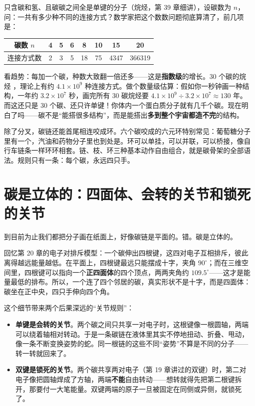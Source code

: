 \begin{qiaoliang}
只含碳和氢、且碳碳之间全是单键的分子（烷烃，第 39 章细讲），设碳数为 $n$，问：一共有多少种不同的连接方式？数学家把这个数数问题彻底算清了，前几项是：

\begin{center}
\begin{tabular}{cccccccc}
\toprule
碳数 $n$ & 4 & 5 & 6 & 8 & 10 & 15 & 20 \\
\midrule
连接方式数 & 2 & 3 & 5 & 18 & 75 & 4347 & 366319 \\
\bottomrule
\end{tabular}
\end{center}

看趋势：每加一个碳，种数大致翻一倍还多——这是\textbf{指数级}的增长。30 个碳的烷烃 ，理论上有约 $4.1\times 10^{9}$ 种连接方式。做个数量级估算：假如你一秒钟画一种结构，一年约 $3.2\times 10^{7}$ 秒，画完所有 30 碳烷烃要 $4.1\times 10^{9}\div 3.2\times 10^{7}\approx 130$ 年。而这还只是 30 个碳、还只许单键！你体内一个蛋白质分子就有几千个碳。现在明白了吗——碳不是“能搭很多结构”，而是能搭出\textbf{多到整个宇宙都造不完}的结构。
\end{qiaoliang}

除了分叉，碳链还能首尾相连咬成环。六个碳咬成的六元环特别常见：葡萄糖分子里有一个，汽油和药物分子里也到处是。环可以单挂，可以并联，可以桥接，像自行车链条一样环环相套。链、枝、环三种基本动作自由组合，就是碳骨架的全部语法。规则只有一条：每个碳，永远四只手。

\section{碳是立体的：四面体、会转的关节和锁死的关节}

到目前为止我们都把分子画在纸面上，好像碳链是平面的。错。碳是立体的。

回忆第 20 章的电子对排斥模型：一个碳伸出四根键，这四对电子互相排斥，彼此离得越远能量越低。在平面上，四根键最远只能摆成十字，夹角 $90^{\circ}$；而在三维空间里，四根键可以指向一个\textbf{正四面体}的四个顶点，两两夹角约 $109.5^{\circ}$——这才是能量最低的排布。所以，一个连了四个邻居的碳，真实形状不是十字，而是四面体：碳坐在正中央，四只手伸向四个角。

这个细节带来两个后果深远的“关节规则”：

\begin{itemize}[itemsep=2pt]
\item \textbf{单键是会转的关节}。两个碳之间只共享一对电子时，这根键像一根圆轴，两端可以绕着轴相对转动。于是一条碳链在液体里其实不停地扭动、折叠、甩动，像一条不断变换姿势的蛇。同一根链的这些不同“姿势”不算是不同的分子——转一转就回来了。
\item \textbf{双键是锁死的关节}。两个碳共享两对电子（第 19 章讲过的双键）时，第二对电子像把圆轴焊成了方轴，两端\textbf{不能}自由转动——想转就得先把第二根键拆开，那要付一大笔能量。双键两端的原子一旦被固定在同侧或异侧，就锁死了。
\end{itemize}

